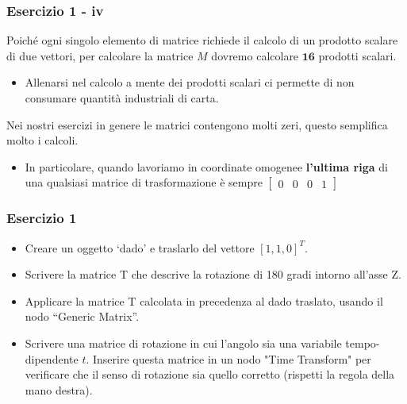 \documentclass{beamer}
\begin{document}
\begin{frame}
\frametitle{Esercizio 1 - iv}

Poich\'e ogni singolo elemento di matrice richiede il calcolo di un prodotto scalare di due vettori,
    per calcolare la matrice $M$ dovremo calcolare $\mathbf{16}$ prodotti scalari.
    \begin{itemize}
        \item Allenarsi nel calcolo a mente dei prodotti scalari ci permette di non 
            consumare quantit\`a industriali di carta.
    \end{itemize}
    Nei nostri esercizi in genere le matrici contengono molti zeri, questo semplifica molto i calcoli.
    \begin{itemize}
        \item In particolare, quando lavoriamo in coordinate omogenee \textbf{l'ultima riga} di una
            qualsiasi matrice di trasformazione \`e sempre 
$\begin{bmatrix} 0 & 0 &  0 &  1 \end{bmatrix}  $
    \end{itemize}

\end{frame}
%
\begin{frame}
\frametitle{Esercizio 1}
\begin{itemize}
    \item Creare un oggetto `dado' e traslarlo del vettore $[1, 1, 0]^T$.
    \item Scrivere la matrice T che descrive la rotazione di 180 gradi intorno all'asse Z.
    \item Applicare la matrice T calcolata in precedenza al dado traslato, usando il nodo
        ``Generic Matrix''.
    \item Scrivere una matrice di rotazione in cui l'angolo sia una variabile tempo-dipendente $t$. Inserire questa matrice in un nodo "Time Transform"
        per verificare che il senso di rotazione sia quello corretto (rispetti la regola della mano destra).
\end{itemize}
\end{frame}
\end{document}
